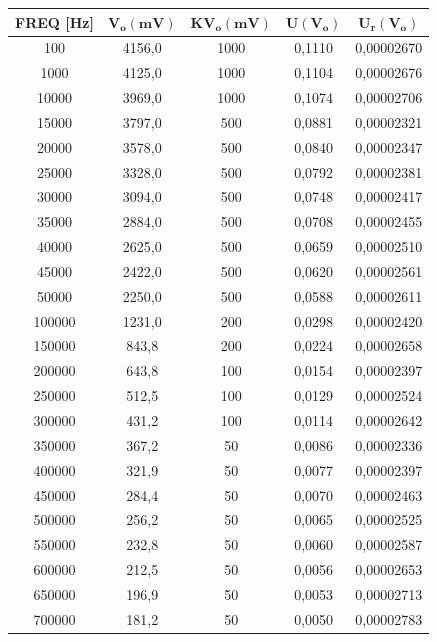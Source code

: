 \begin{table}[!ht]
    \centering
    \begin{tabular}{|c|c|c|c|c|}
    \hline

        \textbf{FREQ [Hz]} & $\bm{V_o(mV)}$ & $\bm{KV_o(mV)}$ & $\bm{U(V_o)}$ & $\bm{U_r(V_o)}$  \\ \hline

      
100	& 4156,0 &	1000	& 0,1110 &	0,00002670  \\ \hline
1000 & 4125,0 & 1000	& 0,1104 &	0,00002676  \\ \hline
10000 & 3969,0 & 1000	& 0,1074 &	0,00002706  \\ \hline
15000	& 3797,0 &	500	& 0,0881 &	0,00002321  \\ \hline
20000	& 3578,0 &	500	& 0,0840 &	0,00002347  \\ \hline
25000	& 3328,0 &	500	& 0,0792 &	0,00002381  \\ \hline
30000	& 3094,0 &	500	& 0,0748 &	0,00002417  \\ \hline
35000	& 2884,0 &	500	& 0,0708 &	0,00002455  \\ \hline
40000	& 2625,0 &	500	& 0,0659 &	0,00002510  \\ \hline
45000	& 2422,0 &	500	& 0,0620 &	0,00002561  \\ \hline
50000	& 2250,0 &	500	& 0,0588 &	0,00002611  \\ \hline
100000	& 1231,0 &	200	& 0,0298 &	0,00002420  \\ \hline
150000	& 843,8	 &  200	& 0,0224 &	0,00002658  \\ \hline
200000	& 643,8	 & 100	& 0,0154 &	0,00002397  \\ \hline
250000	& 512,5	 & 100 &	0,0129 &	0,00002524  \\ \hline
300000	& 431,2 &	100 &	0,0114 &	0,00002642  \\ \hline
350000	& 367,2	& 50 &	0,0086	& 0,00002336  \\ \hline
400000	& 321,9	& 50 &	0,0077	& 0,00002397  \\ \hline
450000	& 284,4	& 50 &	0,0070	& 0,00002463  \\ \hline
500000	& 256,2	& 50 &	0,0065	& 0,00002525  \\ \hline
550000	& 232,8	& 50 &	0,0060	& 0,00002587   \\ \hline
600000	& 212,5	& 50 &	0,0056	& 0,00002653  \\ \hline
650000	& 196,9	& 50 &	0,0053	& 0,00002713  \\ \hline
700000	& 181,2	& 50 &	0,0050	& 0,00002783		 \\ \hline									
        
    \end{tabular}
\end{table}

